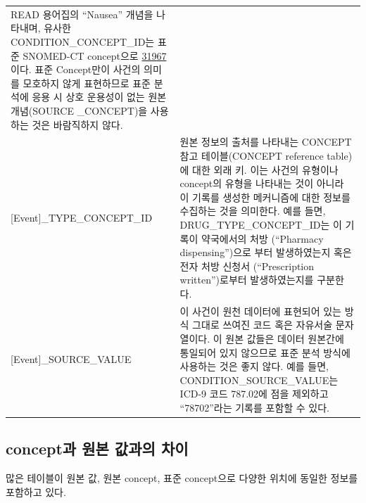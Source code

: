 \documentclass[11pt]{book}
\theoremstyle{definition}
\theoremstyle{definition}
\theoremstyle{definition}
\theoremstyle{remark}
\begin{document}
\begin{longtable}[]{@{}ll@{}}
\begin{minipage}[t]{0.60\columnwidth}
READ 용어집의 ``Nausea'' 개념을 나타내며, 유사한
CONDITION\_CONCEPT\_ID는 표준 SNOMED-CT concept으로
\href{http://athena.ohdsi.org/search-terms/terms/31967}{31967}이다. 표준
Concept만이 사건의 의미를 모호하지 않게 표현하므로 표준 분석에 응용 시
상호 운용성이 없는 원본 개념(SOURCE \_CONCEPT)을 사용하는 것은
바람직하지 않다.\strut
\end{minipage}\tabularnewline
\begin{minipage}[t]{0.34\columnwidth}\raggedright\strut
{[}Event{]}\_TYPE\_CONCEPT\_ID\strut
\end{minipage} & \begin{minipage}[t]{0.60\columnwidth}\raggedright\strut
원본 정보의 출처를 나타내는 CONCEPT 참고 테이블(CONCEPT reference
table)에 대한 외래 키. 이는 사건의 유형이나 concept의 유형을 나타내는
것이 아니라 이 기록를 생성한 메커니즘에 대한 정보를 수집하는 것을
의미한다. 예를 들면, DRUG\_TYPE\_CONCEPT\_ID는 이 기록이 약국에서의 처방
(``Pharmacy dispensing'')으로 부터 발생하였는지 혹은 전자 처방 신청서
(``Prescription written'')로부터 발생하였는지를 구분한다.\strut
\end{minipage}\tabularnewline
\begin{minipage}[t]{0.34\columnwidth}\raggedright\strut
{[}Event{]}\_SOURCE\_VALUE\strut
\end{minipage} & \begin{minipage}[t]{0.60\columnwidth}\raggedright\strut
이 사건이 원천 데이터에 표현되어 있는 방식 그대로 쓰여진 코드 혹은
자유서술 문자열이다. 이 원본 값들은 데이터 원본간에 통일되어 있지
않으므로 표준 분석 방식에 사용하는 것은 좋지 않다. 예를 들면,
CONDITION\_SOURCE\_VALUE는 ICD-9 코드 787.02에 점을 제외하고
``78702''라는 기록를 포함할 수 있다.\strut
\end{minipage}\tabularnewline
\bottomrule
\end{longtable}

\subsection{concept과 원본 값과의 차이}\label{concepts-Sources}

많은 테이블이 원본 값, 원본 concept, 표준 concept으로 다양한 위치에
동일한 정보를 포함하고 있다.
\end{document}
